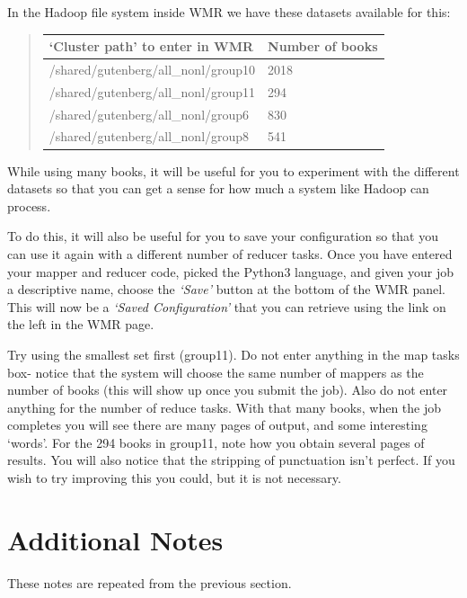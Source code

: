 \documentclass[letterpaper,10pt,openany,oneside]{sphinxmanual}
\begin{document}
\begin{enumerate}
In the Hadoop file system inside WMR we
have these datasets available for this:
\begin{quote}

\begin{tabulary}{\linewidth}{|L|L|}
\hline
\textbf{
`Cluster path' to enter in WMR
} & \textbf{
Number of books
}\\\hline

/shared/gutenberg/all\_nonl/group10
 & 
2018
\\\hline

/shared/gutenberg/all\_nonl/group11
 & 
294
\\\hline

/shared/gutenberg/all\_nonl/group6
 & 
830
\\\hline

/shared/gutenberg/all\_nonl/group8
 & 
541
\\\hline
\end{tabulary}

\end{quote}

While using many books, it will be useful for you to experiment
with the different datasets so that you can get a sense for how
much a system like Hadoop can process.

To do this, it will also be useful for you to save your
configuration so that you can use it again with a different number
of reducer tasks. Once you have entered your mapper and reducer
code, picked the Python3 language, and given your job a descriptive
name, choose the \emph{`Save'} button at the bottom of the WMR panel.
This will now be a \emph{`Saved Configuration'} that you can retrieve
using the link on the left in the WMR page.

Try using the smallest set first (group11). Do not enter anything
in the map tasks box- notice that the system will choose the same
number of mappers as the number of books (this will show up once
you submit the job). Also do not enter anything for the number of
reduce tasks. With that many books, when the job completes you will
see there are many pages of output, and some interesting `words'.
For the 294 books in group11, note how you obtain several pages of
results. You will also notice that the stripping of punctuation
isn't perfect. If you wish to try improving this you could, but it
is not necessary.

\end{enumerate}


\section{Additional Notes}
\label{wmr_py/wmr_py:additional-notes}
These notes are repeated from the previous section.
\end{document}

